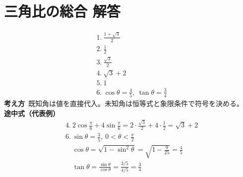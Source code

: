 \documentclass[paper=b4j,landscape,twocolumn,fleqn]{jlreq}
\begin{document}
\section{三角比の総合 解答}
\begin{align*}
&1.\ \frac{1+\sqrt3}{2}\\[0.45em]
&2.\ \frac12\\[0.45em]
&3.\ \frac{\sqrt3}{2}\\[0.45em]
&4.\ \sqrt3+2\\[0.45em]
&5.\ 1\\[0.45em]
&6.\ \cos\theta=\frac45,\ \tan\theta=\frac34
\end{align*}
\textbf{考え方}\
既知角は値を直接代入。未知角は恒等式と象限条件で符号を決める。\\
\textbf{途中式（代表例）}
\begin{align*}
&4.\ 2\cos\frac\pi6+4\sin\frac\pi6=2\cdot\frac{\sqrt3}{2}+4\cdot\frac12=\sqrt3+2\\
&6.\ \sin\theta=\frac35,\ 0<\theta<\frac\pi2\\
&\quad \cos\theta=\sqrt{1-\sin^2\theta}=\sqrt{1-\frac{9}{25}}=\frac45\\
&\quad \tan\theta=\frac{\sin\theta}{\cos\theta}=\frac{3/5}{4/5}=\frac34
\end{align*}
\end{document}
